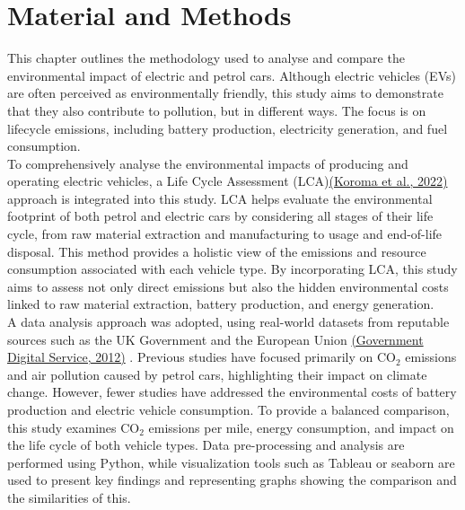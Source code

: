 \chapter{Material and Methods}
\label{ch:method} %



This chapter outlines the methodology used to analyse and compare the environmental impact of electric and petrol cars.
 Although electric vehicles (EVs) are often perceived as environmentally friendly,
 this study aims to demonstrate that they also contribute to pollution, but in different ways.
 The focus is on lifecycle emissions, including battery production, electricity generation, and fuel consumption.\\ 

To comprehensively analyse the environmental impacts of producing and operating electric vehicles, a Life Cycle Assessment (LCA)\href{https://www.sciencedirect.com/science/article/pii/S0048969722019520}{(Koroma et al., 2022)} approach is integrated into this study. LCA  helps evaluate the environmental footprint of both petrol and electric cars by considering all stages of their life cycle, from raw material extraction and manufacturing to usage and end-of-life disposal. This method provides a holistic view of the emissions and resource consumption associated with each vehicle type. By incorporating LCA, this study aims to assess not only direct emissions but also the hidden environmental costs linked to raw material extraction, battery production, and energy generation. \\
 
 A data analysis approach was adopted, using real-world datasets from
reputable sources such as the UK Government and the European Union \href{https://www.gov.uk/co2-and-vehicle-tax-tools}{(Government Digital Service, 2012)} . Previous studies have focused primarily on CO$_2$ emissions and air pollution caused by petrol cars, highlighting their impact on climate change.
 However, fewer studies have addressed the environmental costs of battery production and electric vehicle consumption. To provide a balanced comparison, this study examines
CO$_2$ emissions per mile, energy consumption, and impact on the life cycle of both vehicle types.
Data pre-processing and analysis are performed using Python, while visualization tools such
as Tableau or seaborn are used to present key findings and representing graphs showing the comparison and 
the similarities of this. 

